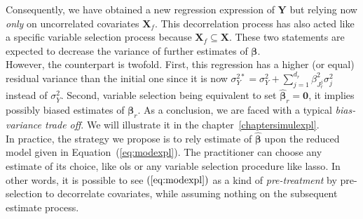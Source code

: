 \documentclass[12pt,a4paper]{report}
\begin{document}
Consequently, we have obtained a new regression expression of $\boldsymbol{Y}$ but relying now {\it only} on uncorrelated covariates $\boldsymbol{X}_f$. This decorrelation process has also acted like a specific variable selection process because $\boldsymbol{X}_f \subseteq \boldsymbol{X}$. These two statements are expected to decrease the variance of further estimates of $\boldsymbol{\beta}$.\\

 However, the counterpart is twofold. First, this regression has a higher (or equal) residual variance than the initial one since it is now $\sigma^{2*}_Y=\sigma^2_Y+\sum_{j =1}^{d_r}\beta_{J_r^j}^2\sigma^2_j$ instead of $\sigma^2_Y$. Second, variable selection being equivalent to set $\hat{\boldsymbol{\beta}}_r=\boldsymbol{0}$, it implies possibly biased estimates of $\boldsymbol{\beta}_r$. As a conclusion, we are faced with a typical {\it bias-variance trade off}. We will illustrate it in the chapter~\ref{chaptersimulexpl}.\\


In practice, the strategy we propose is to rely estimate of  $\hat{\boldsymbol{\beta}}$ upon the reduced model given in Equation~(\ref{eq:modexpl}). The practitioner can choose any estimate of its choice, like {\sc ols} or any variable selection procedure like {\sc lasso}. In other words, it is possible to see $(\ref{eq:modexpl})$ as a kind of {\it pre-treatment} by pre-selection to decorrelate covariates, while assuming nothing on the subsequent estimate process.\\

\end{document}
